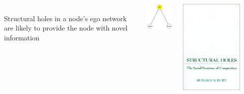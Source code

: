 \documentclass[8pt]{beamer}
\begin{document}
\begin{frame}
\frametitle{\insertsection}

\begin{columns}[c]
{\color{blue}{Structural holes}}\\
Structural holes in a node's ego network are likely to provide the node with novel information

\medskip
\medskip

\centering
\includegraphics[width=3cm]{opentriad}

\centering
\includegraphics[width=0.8\textwidth]{burtcover}\\
{\tiny \cite{Burt1992}}

\end{columns}

\end{frame}
\end{document}
